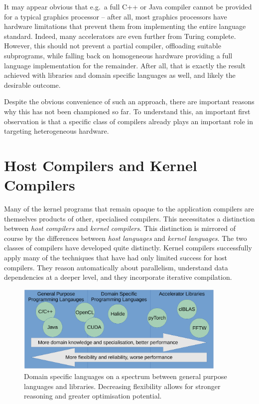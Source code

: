     It may appear obvious that e.g.\ a full C++ or Java compiler cannot be
    provided for a typical graphics processor -- after all, most graphics
    processors have hardware limitations that prevent them from implementing the
    entire language standard.
    Indeed, many accelerators are even further from Turing complete.
    However, this should not prevent a partial compiler, offloading suitable
    subprograms, while falling back on homogeneous hardware providing a full
    language implementation for the remainder.
    After all, that is exactly the result achieved with libraries and domain
    specific languages as well, and likely the desirable outcome.

    Despite the obvious convenience of such an approach, there are important
    reasons why this has not been championed so far.
    To understand this, an important first observation is that a specific class
    of compilers already plays an important role in targeting heterogeneous
    hardware.

\section{Host Compilers and Kernel Compilers}

    Many of the kernel programs that remain opaque to the application compilers
    are themselves products of other, specialised compilers.
    This necessitates a distinction between {\em host compilers} and {\em kernel
    compilers}.
    This distinction is mirrored of course by the differences between {\em host
    languages} and {\em kernel languages}.
    The two classes of compilers have developed quite distinctly.
    Kernel compilers successfully apply many of the techniques that have had
    only limited success for host compilers.
    They reason automatically about parallelism, understand data dependencies at
    a deeper level, and they incorporate iterative compilation.

\begin{figure}[t]
\centering
\includegraphics[width=0.9\textwidth]{figures/DSLgradient}
\caption{Domain specific languages on a spectrum between general purpose
         languages and libraries.
         Decreasing flexibility allows for stronger reasoning and greater
         optimisation potential.}
\label{specialgradient}
\end{figure}

